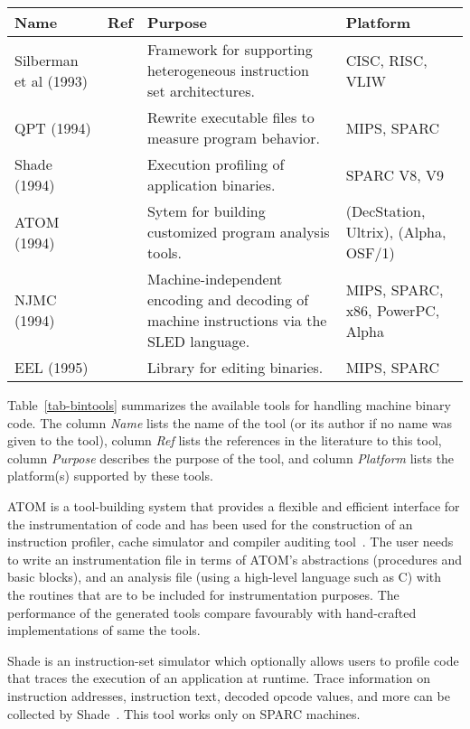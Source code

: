 \begin{table*}[hbtp]
{\small
\begin{tabular}{|p{2.0cm}|p{0.7cm}|p{7.8cm}|p{3.0cm}|} \hline
Name & Ref & Purpose & Platform \\ \hline
Silberman et al (1993) & \cite{Silb93} &
	Framework for supporting heterogeneous instruction set architectures. &
	CISC, RISC, VLIW \\
QPT (1994) & \cite{Laru94} &
	Rewrite executable files to measure program behavior. &
	MIPS, SPARC \\
Shade (1994) & \cite{Cmel94} &
	Execution profiling of application binaries. &
	SPARC V8, V9 \\
ATOM (1994) & \cite{Dec94,Eust95} &
	Sytem for building customized program analysis tools. &
	(DecStation, Ultrix), (Alpha, OSF/1) \\
NJMC (1994) & \cite{Rams95,Rams94,Rams97} & 
	Machine-independent encoding and decoding of machine instructions
	via the SLED language. &
	MIPS, SPARC, x86, PowerPC, Alpha \\
EEL (1995) & \cite{Laru95} &
	Library for editing binaries. &
	MIPS, SPARC \\
\hline
\end{tabular}
\caption{\label{tab-bintools} {Summary of Binary-code Manipulation  
	Tools in Cronological Order.}}
}
\end{table*}

Table~\ref{tab-bintools} summarizes the available tools for handling
machine binary code.  The column \emph{Name} lists the name of the
tool (or its author if no name was given to the tool), column 
\emph{Ref} lists the references in the literature to this tool,
column \emph{Purpose} describes the purpose of the tool, and column 
\emph{Platform} lists the platform(s) supported by these tools. 

ATOM is a tool-building system that provides a flexible and efficient
interface for the instrumentation of code and has been used for the
construction of an instruction profiler, cache simulator and compiler
auditing tool~\cite{Eust95}.  The user needs to write an instrumentation
file in terms of ATOM's abstractions (procedures and basic blocks),
and an analysis file (using a high-level language such as C) with the 
routines that are to be included for instrumentation purposes.  
The performance of the generated tools compare favourably with 
hand-crafted implementations of same the tools. 

Shade is an instruction-set simulator which optionally allows users to 
profile code that traces the execution of an application at runtime.  
Trace information on instruction addresses, instruction text, decoded
opcode values, and more can be collected by Shade~\cite{Cmel94}.
This tool works only on SPARC machines.

